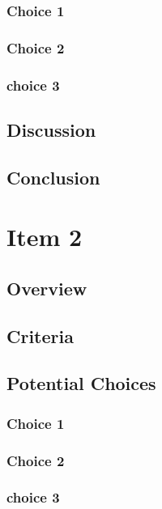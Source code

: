 \documentclass[letterpaper,10pt]{article}
\begin{document}
		\subsubsection{Choice 1}
		
		\subsubsection{Choice 2}
		
		\subsubsection{choice 3}
		
	\subsection{Discussion}
	
	\subsection{Conclusion}
	
	
\section{Item 2}
		\subsection{Overview}
	
	\subsection{Criteria}
	
	\subsection{Potential Choices}
		\subsubsection{Choice 1}
		
		\subsubsection{Choice 2}
		
		\subsubsection{choice 3}
		
\end{document}
